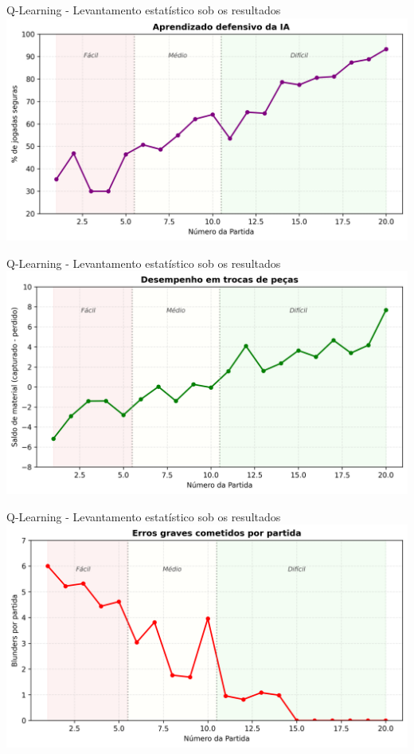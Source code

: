 \documentclass{beamer}
\begin{document}
\begin{frame}[plain]{Q-Learning - Levantamento estatístico sob os resultados}
  \centering
  \includegraphics[width=\paperwidth,height=0.7\paperheight,keepaspectratio]{images/seguras_niveis.png}
\end{frame}

\begin{frame}[plain]{Q-Learning - Levantamento estatístico sob os resultados}
  \centering
  \includegraphics[width=\paperwidth,height=0.7\paperheight,keepaspectratio]{images/material_niveis.png}
\end{frame}

\begin{frame}[plain]{Q-Learning - Levantamento estatístico sob os resultados}
  \centering
  \includegraphics[width=\paperwidth,height=0.7\paperheight,keepaspectratio]{images/blunders_niveis.png}
\end{frame}
\end{document}
